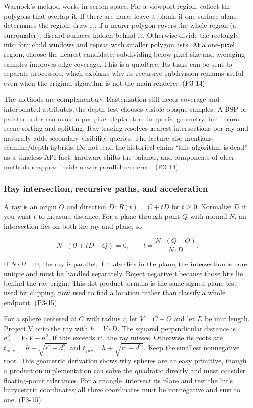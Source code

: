 Warnock's method works in screen space. For a viewport region, collect the polygons that overlap it. If there are none, leave it blank; if one surface alone determines the region, draw it; if a nearer polygon covers the whole region (a surrounder), discard surfaces hidden behind it. Otherwise divide the rectangle into four child windows and repeat with smaller polygon lists. At a one-pixel region, choose the nearest candidate; subdividing below pixel size and averaging samples improves edge coverage. This is a quadtree. Its tasks can be sent to separate processors, which explains why its recursive subdivision remains useful even when the original algorithm is not the main renderer. (P3-14)

The methods are complementary. Rasterization still needs coverage and interpolated attributes; the depth test chooses visible opaque samples. A BSP or painter order can avoid a per-pixel depth store in special geometry, but incurs scene sorting and splitting. Ray tracing resolves nearest intersections per ray and naturally adds secondary visibility queries. The lecture also mentions scanline/depth hybrids. Do not read the historical claim ``this algorithm is dead'' as a timeless API fact: hardware shifts the balance, and components of older methods reappear inside newer parallel renderers. (P3-14)

\subsubsection{Ray intersection, recursive paths, and acceleration}\label{04-visual-computing-ii-ch029-ray-intersection-recursive-paths-and-acceleration}

A ray is an origin \(O\) and direction \(D\): \(R(t)=O+tD\) for \(t\ge0\). Normalize \(D\) if you want \(t\) to measure distance. For a plane through point \(Q\) with normal \(N\), an intersection lies on both the ray and plane, so

\[
N\cdot(O+tD-Q)=0,\qquad t=\frac{N\cdot(Q-O)}{N\cdot D}.
\]

If \(N\cdot D=0\), the ray is parallel; if it also lies in the plane, the intersection is non-unique and must be handled separately. Reject negative t because those hits lie behind the ray origin. This dot-product formula is the same signed-plane test used for clipping, now used to find a location rather than classify a whole endpoint. (P3-15)

For a sphere centered at \(C\) with radius \(r\), let \(V=C-O\) and let \(D\) be unit length. Project V onto the ray with \(h=V\cdot D\). The squared perpendicular distance is \(d_\perp^2=V\cdot V-h^2\). If this exceeds \(r^2\), the ray misses. Otherwise its roots are \(t_{near}=h-\sqrt{r^2-d_\perp^2}\) and \(t_{far}=h+\sqrt{r^2-d_\perp^2}\). Keep the smallest nonnegative root. This geometric derivation shows why spheres are an easy primitive, though a production implementation can solve the quadratic directly and must consider floating-point tolerances. For a triangle, intersect its plane and test the hit's barycentric coordinates; all three coordinates must be nonnegative and sum to one. (P3-15)

